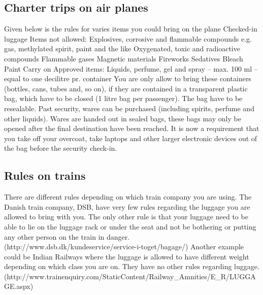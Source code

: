 \subsection{Charter trips on air planes}
Given below is the rules for varies items you could bring on the plane
\newline
\newline
Checked-in luggage
\newline
Items not allowed:
\newline
Explosives, corrosive and flammable compounds e.g. gas, methylated spirit, paint and the like  
\newline
Oxygenated, toxic and radioactive compounds 
\newline
Flammable gases 
\newline
Magnetic materials 
\newline
Fireworks 
\newline
Sedatives 
\newline
Bleach 
\newline
Paint
\newline\newline
Carry on
\newline
Approved items:
\newline
Liquids, perfume, gel and spray – max. 100 ml – equal to one decilitre pr. container \newline
You are only allow to bring these containers (bottles, cans, tubes and, so on), if they are contained in a transparent plastic bag, which have to be closed (1 litre bag per passenger).
The bag have to be resealable.
\newline
Past security, wares can be purchased (including spirits, perfume and other liquids). Wares are handed out in sealed bags, these bags may only be opened after the final destination have been reached.
\newline
It is now a requirement that you take off your overcoat, take laptops and other larger electronic devices out of the bag before the security check-in.\\
\citep{Prohibited_luggage}

\subsection{Rules on trains}

There are different rules depending on which train company you are using. 
\newline
The Danish train company, DSB, have very few rules regarding the luggage you are allowed to bring with you. 
\newline\newline
The only other rule is that your luggage need to be able to lie on the luggage rack or under the seat and not be bothering or putting any other person on the train in danger. (http://www.dsb.dk/kundeservice/service-i-toget/bagage/)
\newline\newline
Another example could be Indian Railways where the luggage is allowed to have different weight depending on which class you are on. They have no other rules regarding luggage. (http://www.trainenquiry.com/StaticContent/Railway\_Amnities/E\_R/LUGGAGE.aspx)